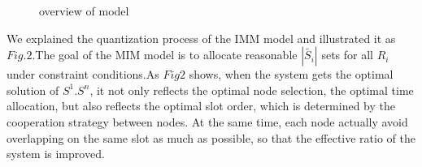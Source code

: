 \documentclass[conference,compsoc]{IEEEtran}
\begin{document}
\begin{figure}[!!!!!!!!!!!!!!hhhhhhhhhht]
\centering
{}
\caption{overview of model}
\label{fig_1_model}
\end{figure}
We explained the quantization process of the IMM model and illustrated it as $Fig.2$.The goal of the MIM model is to allocate reasonable $|\widetilde{{{S}_{i}}}|$ sets for all $R_i$under constraint conditions.As $Fig2$ shows, when the system gets the optimal solution of $S ^ 1. S ^ n $, it not only reflects the optimal node selection, the optimal time allocation, but also reflects the optimal slot order, which is determined by the cooperation strategy between nodes. At the same time, each node actually avoid overlapping on the same slot as much as possible, so that the effective ratio of the system is improved.
\end{document}
